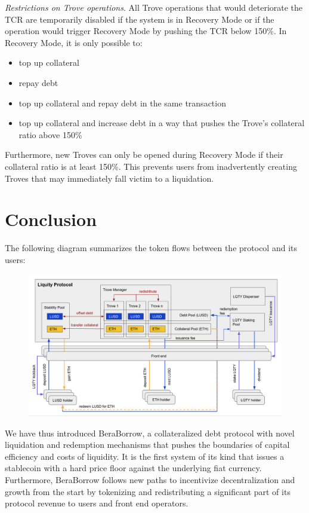\documentclass{article}
\begin{document}
\textit{Restrictions on Trove operations}. All Trove operations that would deteriorate the TCR are temporarily disabled if the system is in Recovery Mode or if the operation would trigger Recovery Mode by pushing the TCR below 150\%. In Recovery Mode, it is only possible to:
\begin{itemize}
    \item top up collateral
    \item repay debt
    \item top up collateral and repay debt in the same transaction 
    \item top up collateral and increase debt in a way that pushes the Trove's collateral ratio above 150\%
\end{itemize}

Furthermore, new Troves can only be opened during Recovery Mode if their collateral ratio is at least 150\%. This prevents users from inadvertently creating Troves that may immediately fall victim to a liquidation.

\section{Conclusion}
The following diagram summarizes the token flows between the protocol and its users:\\

\begin{figure}[ht]
\centering
\includegraphics[width=16cm]{a14.png}
\end{figure}

We have thus introduced BeraBorrow, a collateralized debt protocol with novel liquidation and redemption mechanisms that pushes the boundaries of capital efficiency and costs of liquidity. It is the first system of its kind that issues a stablecoin with a hard price floor against the underlying fiat currency. Furthermore, BeraBorrow follows new paths to incentivize decentralization and growth from the start by tokenizing and redistributing a significant part of its protocol revenue to users and front end operators. 
\end{document}
